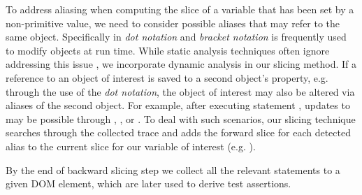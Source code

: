 To address aliasing when computing the slice of a variable that has been set by a non-primitive value, we need to consider possible aliases that may refer to the same object. Specifically in \javascript \textit{dot notation} and \textit{bracket notation} is frequently used to modify objects at run time. While static analysis techniques often ignore addressing this issue \cite{Feldthaus:icse13}, we incorporate dynamic analysis in our slicing method. If a reference to an object of interest is saved to a second object's property, e.g. through the use of the \textit{dot notation}, the object of interest may also be altered via aliases of the second object. For example, after executing statement , updates to  may be possible through , , or . To deal with such scenarios, our slicing technique searches through the collected trace and adds the forward slice for each detected alias to the current slice for our variable of interest (e.g. ). 

By the end of backward slicing step we collect all the relevant statements to a given DOM element, which are later used to derive test assertions.    